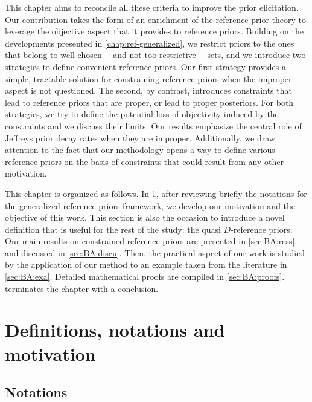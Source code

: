 This chapter aims to reconcile all these criteria to improve the prior elicitation.
Our contribution takes the form of an enrichment of the reference prior theory to leverage the objective aspect that it provides to reference priors. Building on the developments presented in \cref{chap:ref-generalized},
we restrict priors to the ones that belong to  well-chosen ---and not too restrictive--- sets, and we introduce two strategies to define  convenient reference priors.
Our first strategy provides a simple,  tractable solution for constraining reference priors when the improper aspect is not questioned. The second, by contrast, introduces constraints that lead to  reference priors that are proper, or lead to proper posteriors. 
% 
For both strategies, we try to define the potential loss of objectivity induced by the constraints and we discuss their limits.
Our results emphasize the central role of Jeffreys prior decay rates when they are improper.
Additionally, we draw attention to the fact that our methodology opens a way to define various reference priors on the basis of constraints that could result from any other motivation.



This chapter is organized as follows.
In \cref{sec:BA:defsnotsmots}, after reviewing briefly the notations for the generalized reference priors framework, we develop our motivation and the objective of this work. This section is also the occasion to introduce a novel definition that is useful for the rest of the study: the quasi $D$-reference priors.
Our main results on constrained reference priors are presented in \cref{sec:BA:ress}, and discussed in \cref{sec:BA:discu}.
Then, the  practical aspect of our work is studied by the application of our method to an example taken from  the literature in \cref{sec:BA:exa}. Detailed mathematical proofs are compiled in \cref{sec:BA:proofs}.  terminates the chapter with a conclusion.


\section{Definitions, notations and motivation}\label{sec:BA:defsnotsmots}

\subsection{Notations}\label{sec:BA:nots}


